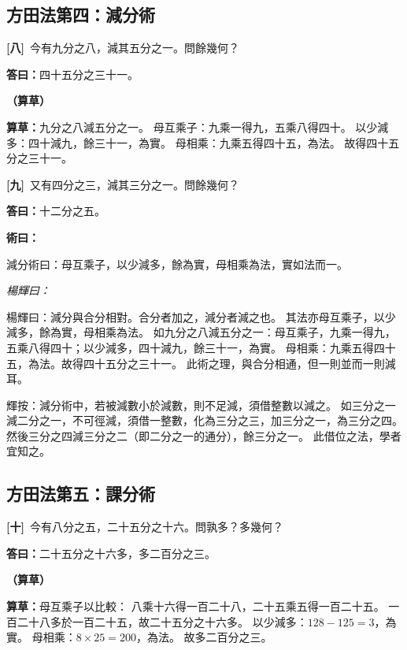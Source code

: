 \documentclass[11pt,a4paper]{article}
\newenvironment{method}{%
  \par\noindent\textcolor{methodcolor}{\textbf{術曰：}}%
  \ignorespaces
}{\par\vspace{0.5em}}
\newenvironment{caocao}{%
  \par\noindent\textcolor{caocaocolor}{\small\textbf{（算草）}}%
  \ignorespaces
}{\par\vspace{0.5em}}
\newenvironment{yanghuicomment}{%
  \par\noindent\textcolor{commentarycolor}{\small\textit{楊輝曰：}}%
  \ignorespaces
}{\par\vspace{0.5em}}
\newcommand{\problemnum}[1]{\textbf{[\ignorespaces#1\unskip]}}
\begin{document}
\subsection{方田法第四：減分術}

\noindent\problemnum{八}\,
今有九分之八，減其五分之一。問餘幾何？

\noindent\textcolor{answercolor}{\textbf{答曰：}}四十五分之三十一。

\begin{caocao}
\textbf{算草：}九分之八減五分之一。
母互乘子：九乘一得九，五乘八得四十。
以少減多：四十減九，餘三十一，為實。
母相乘：九乘五得四十五，為法。
故得四十五分之三十一。
\end{caocao}

\noindent\problemnum{九}\,
又有四分之三，減其三分之一。問餘幾何？

\noindent\textcolor{answercolor}{\textbf{答曰：}}十二分之五。

\begin{method}
減分術曰：母互乘子，以少減多，餘為實，母相乘為法，實如法而一。
\end{method}

\begin{yanghuicomment}
楊輝曰：減分與合分相對。合分者加之，減分者減之也。
其法亦母互乘子，以少減多，餘為實，母相乘為法。
如九分之八減五分之一：母互乘子，九乘一得九，五乘八得四十；以少減多，四十減九，餘三十一，為實。
母相乘：九乘五得四十五，為法。故得四十五分之三十一。
此術之理，與合分相通，但一則並而一則減耳。

輝按：減分術中，若被減數小於減數，則不足減，須借整數以減之。
如三分之一減二分之一，不可徑減，須借一整數，化為三分之三，加三分之一，為三分之四。
然後三分之四減三分之二（即二分之一的通分），餘三分之一。
此借位之法，學者宜知之。
\end{yanghuicomment}

\subsection{方田法第五：課分術}

\noindent\problemnum{十}\,
今有八分之五，二十五分之十六。問孰多？多幾何？

\noindent\textcolor{answercolor}{\textbf{答曰：}}二十五分之十六多，多二百分之三。

\begin{caocao}
\textbf{算草：}母互乘子以比較：
八乘十六得一百二十八，二十五乘五得一百二十五。
一百二十八多於一百二十五，故二十五分之十六多。
以少減多：$128 - 125 = 3$，為實。
母相乘：$8 \times 25 = 200$，為法。
故多二百分之三。
\end{caocao}
\end{document}
